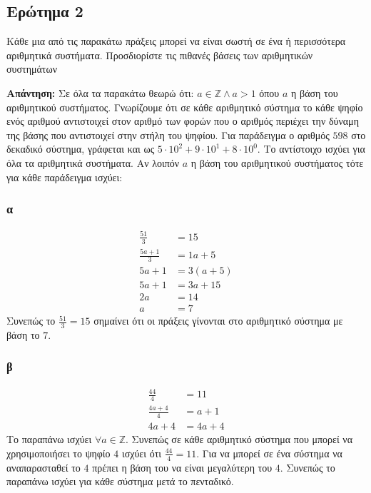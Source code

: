 \documentclass[draft]{article}
\begin{document}
\subsection{Ερώτημα 2}
Κάθε μια από τις παρακάτω πράξεις μπορεί να είναι σωστή σε ένα ή
περισσότερα αριθμητικά συστήματα. Προσδιορίστε τις πιθανές βάσεις των
αριθμητικών συστημάτων 

\textbf{Απάντηση: }
Σε όλα τα παρακάτω θεωρώ ότι: $a \in \mathbb{Z} \land a > 1$ όπου $a$ η βάση του αριθμητικού συστήματος.
Γνωρίζουμε ότι σε κάθε αριθμητικό σύστημα το κάθε ψηφίο ενός αριθμού αντιστοιχεί στον αριθμό των φορών που ο αριθμός περιέχει την δύναμη της βάσης που αντιστοιχεί στην στήλη του ψηφίου.
Για παράδειγμα ο αριθμός $598$ στο δεκαδικό σύστημα, γράφεται και ως $5 \cdot 10^2 + 9 \cdot 10^1 + 8 \cdot 10^0$. Το αντίστοιχο ισχύει για όλα τα αριθμητικά συστήματα.
Αν λοιπόν $a$ η βάση του αριθμητικού συστήματος τότε για κάθε παράδειγμα ισχύει:
\subsubsection{α}
\begin{align*}
  \frac{51}{3} &= 15 \\
  \frac{5a + 1}{3} &= 1a + 5 \\
  5a + 1 &= 3(a + 5) \\
  5a + 1 &= 3a + 15 \\
  2a &= 14 \\
  a &= 7
\end{align*}
Συνεπώς το $\frac{51}{3} = 15$ σημαίνει ότι οι πράξεις γίνονται στο αριθμητικό σύστημα με βάση το $7$.

\subsubsection{β}
\begin{align*}
  \frac{44}{4} &= 11\\ 
  \frac{4a + 4}{4} &= a + 1\\
  4a + 4 &= 4a + 4
\end{align*}
Το παραπάνω ισχύει $\forall a \in \mathbb{Z}$. Συνεπώς σε κάθε αριθμητικό σύστημα που μπορεί να χρησιμοποιήσει το ψηφίο $4$ ισχύει ότι $\frac{44}{4} = 11$.
Για να μπορεί σε ένα σύστημα να αναπαρασταθεί το $4$ πρέπει η βάση του να είναι μεγαλύτερη του $4$. Συνεπώς το παραπάνω ισχύει για κάθε σύστημα μετά το πενταδικό.
\end{document}
